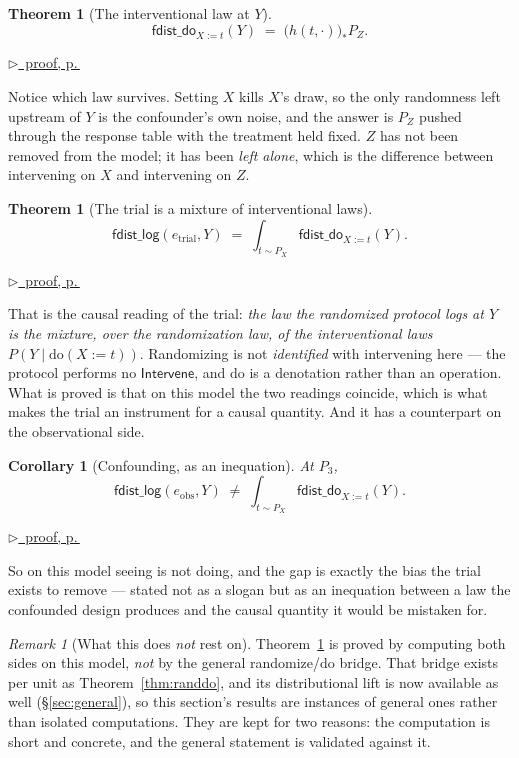 \documentclass[11pt,a4paper]{article}
\theoremstyle{definition}
\theoremstyle{plain}
\newtheorem{theorem}[definition]{Theorem}
\newtheorem{corollary}[definition]{Corollary}
\theoremstyle{remark}
\newtheorem{remark}[definition]{Remark}
\newcommand{\fdo}{\mathsf{fdist\_do}}
\newcommand{\push}[1]{{#1}_{*}}        %
\newcommand{\pfref}[1]{%
  \par\smallskip\noindent
  \hyperref[pf:#1]{\small$\triangleright$\ proof, p.\,\pageref{pf:#1}}\par\smallskip}
\begin{document}
\begin{theorem}[The interventional law at $Y$]
\label{thm:do3}
\[
  \fdo_{X := t}(Y) \;=\; \push{\bigl(h(t,\cdot)\bigr)} P_Z .
\]
\end{theorem}

\pfref{thm:do3}

Notice which law survives. Setting $X$ kills $X$'s draw, so the only
randomness left upstream of $Y$ is the confounder's own noise, and the
answer is $P_Z$ pushed through the response table with the treatment held
fixed. $Z$ has not been removed from the model; it has been \emph{left
alone}, which is the difference between intervening on $X$ and intervening
on $Z$.

\begin{theorem}[The trial is a mixture of interventional laws]
\label{thm:rct3do}
\[
  \mathsf{fdist\_log}(e_{\mathrm{trial}}, Y)
  \;=\;
  \int_{t \sim P_X} \fdo_{X := t}(Y) .
\]
\end{theorem}

\pfref{thm:rct3do}

That is the causal reading of the trial: \emph{the law the randomized
protocol logs at $Y$ is the mixture, over the randomization law, of the
interventional laws $P(Y \mid \mathrm{do}(X := t))$}. Randomizing is not
\emph{identified} with intervening here --- the protocol performs no
$\mathsf{Intervene}$, and $\mathrm{do}$ is a denotation rather than an
operation. What is proved is that on this model the two readings coincide,
which is what makes the trial an instrument for a causal quantity. And it
has a counterpart on the observational side.

\begin{corollary}[Confounding, as an inequation]
\label{cor:obsnotdo}
At $P_3$,
\[
  \mathsf{fdist\_log}(e_{\mathrm{obs}}, Y)
  \;\neq\;
  \int_{t \sim P_X} \fdo_{X := t}(Y) .
\]
\end{corollary}

\pfref{cor:obsnotdo}

So on this model seeing is not doing, and the gap is exactly the bias the
trial exists to remove --- stated not as a slogan but as an inequation
between a law the confounded design produces and the causal quantity it
would be mistaken for.

\begin{remark}[What this does \emph{not} rest on]
\label{rem:notthebridge}
Theorem~\ref{thm:rct3do} is proved by computing both sides on this model,
\emph{not} by the general randomize/$\mathrm{do}$ bridge. That bridge
exists per unit as Theorem~\ref{thm:randdo}, and its distributional lift
is now available as well (\S\ref{sec:general}), so this section's results
are instances of general ones rather than isolated computations. They are
kept for two reasons: the computation is short and concrete, and the
general statement is validated against it.
\end{remark}
\end{document}
